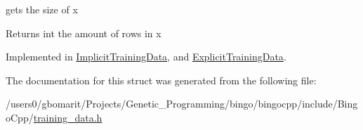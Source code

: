 gets the size of x 

\begin{DoxyReturn}{Returns}
int the amount of rows in x 
\end{DoxyReturn}


Implemented in \hyperlink{structImplicitTrainingData_aa3be8b04a160fb496668bba52507d3e4}{Implicit\+Training\+Data}, and \hyperlink{structExplicitTrainingData_aa5a3da99babf2436bdb9b4652a217584}{Explicit\+Training\+Data}.



The documentation for this struct was generated from the following file\+:\begin{DoxyCompactItemize}
\item 
/users0/gbomarit/\+Projects/\+Genetic\+\_\+\+Programming/bingo/bingocpp/include/\+Bingo\+Cpp/\hyperlink{training__data_8h}{training\+\_\+data.\+h}\end{DoxyCompactItemize}
